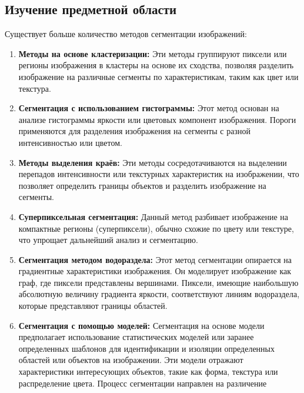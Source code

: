 \documentclass[11pt]{article}
\providecommand{\tightlist}{%
      \setlength{\itemsep}{0pt}\setlength{\parskip}{0pt}}
\begin{document}
    \hypertarget{ux438ux437ux443ux447ux435ux43dux438ux435-ux43fux440ux435ux434ux43cux435ux442ux43dux43eux439-ux43eux431ux43bux430ux441ux442ux438}{%
\subsection{Изучение предметной
области}\label{ux438ux437ux443ux447ux435ux43dux438ux435-ux43fux440ux435ux434ux43cux435ux442ux43dux43eux439-ux43eux431ux43bux430ux441ux442ux438}}

    Существует больше количество методов сегментации изображений:

\begin{enumerate}
\def\labelenumi{\arabic{enumi}.}
\tightlist
\item
  \textbf{Методы на основе кластеризации:} Эти методы группируют пиксели
  или регионы изображения в кластеры на основе их сходства, позволяя
  разделить изображение на различные сегменты по характеристикам, таким
  как цвет или текстура.
\item
  \textbf{Сегментация с использованием гистограммы:} Этот метод основан
  на анализе гистограммы яркости или цветовых компонент изображения.
  Пороги применяются для разделения изображения на сегменты с разной
  интенсивностью или цветом.
\item
  \textbf{Методы выделения краёв:} Эти методы сосредотачиваются на
  выделении перепадов интенсивности или текстурных характеристик на
  изображении, что позволяет определить границы объектов и разделить
  изображение на сегменты.
\item
  \textbf{Суперпиксельная сегментация:} Данный метод разбивает
  изображение на компактные регионы (суперпиксели), обычно схожие по
  цвету или текстуре, что упрощает дальнейший анализ и сегментацию.
\item
  \textbf{Сегментация методом водораздела:} Этот метод сегментации
  опирается на градиентные характеристики изображения. Он моделирует
  изображение как граф, где пиксели представлены вершинами. Пиксели,
  имеющие наибольшую абсолютную величину градиента яркости,
  соответствуют линиям водораздела, которые представляют границы
  областей.
\item
  \textbf{Сегментация с помощью моделей:} Сегментация на основе модели
  предполагает использование статистических моделей или заранее
  определенных шаблонов для идентификации и изоляции определенных
  областей или объектов на изображении. Эти модели отражают
  характеристики интересующих объектов, такие как форма, текстура или
  распределение цвета. Процесс сегментации направлен на различение

\end{enumerate}
\end{document}

